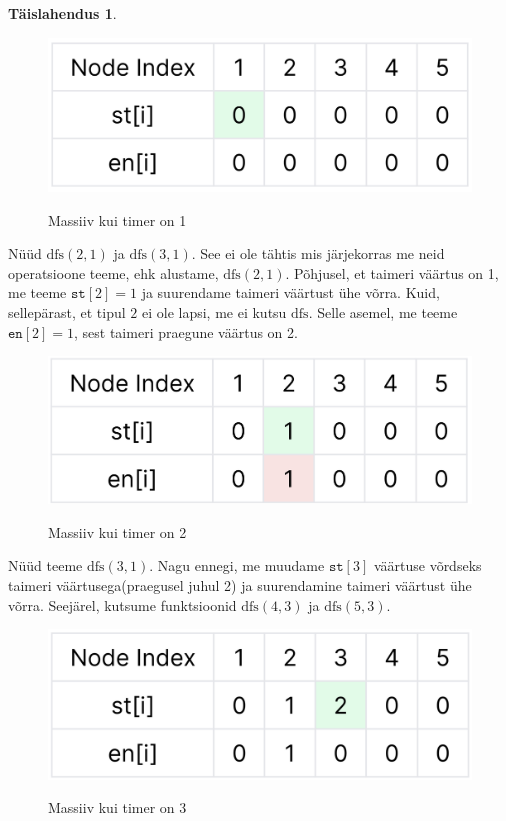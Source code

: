 \documentclass{trkut}
\theoremstyle{definition}
\newtheorem*{solution}{Täislahendus}
\begin{document}
\begin{solution}
\begin{figure}[H]%
    \includegraphics[width=12cm]{second.jpeg}%
    \caption{Massiiv kui timer on 1}%
    \label{joonis}%
\end{figure}

Nüüd $\text{dfs}(2, 1)$ ja $\text{dfs}(3, 1)$. 
See ei ole tähtis mis järjekorras me neid operatsioone teeme, ehk alustame,
$\text{dfs}(2, 1)$. Põhjusel, et taimeri väärtus on 1, me teeme $\texttt{st}[2]=1$ ja suurendame taimeri väärtust ühe võrra. Kuid, sellepärast, et tipul $2$ ei ole lapsi, me ei kutsu
$\text{dfs}$. Selle asemel, me teeme $\texttt{en}[2]=1$, sest taimeri praegune väärtus on 2.

\begin{figure}[H]%
    \includegraphics[width=12cm]{third.jpeg}%
    \caption{Massiiv kui timer on 2}%
    \label{joonis}%
\end{figure}

Nüüd teeme $\text{dfs}(3, 1)$. 
Nagu ennegi, me muudame
$\texttt{st}[3]$ väärtuse võrdseks taimeri väärtusega(praegusel juhul 2) ja suurendamine taimeri väärtust ühe võrra. 
Seejärel, kutsume funktsioonid $\text{dfs}(4, 3)$ ja
$\text{dfs}(5, 3)$.

\begin{figure}[H]%
    \includegraphics[width=12cm]{fourth.jpeg}%
    \caption{Massiiv kui timer on 3}%
    \label{joonis}%
\end{figure}


\end{solution}
\end{document}
